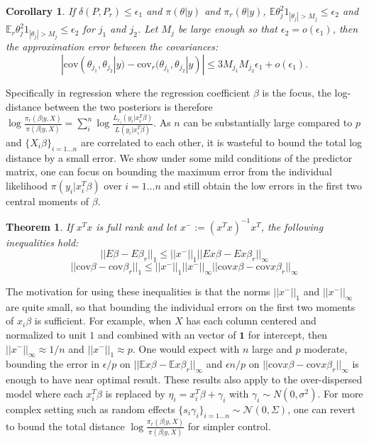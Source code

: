 \documentclass[10pt]{article}
\newcommand{\xbeta}{ x_i^T \beta}
\newtheorem{theorem}{Theorem}
\newtheorem{corollary}{Corollary}
\begin{document}
\begin{corollary}
If $\delta( P,P_r)\le \epsilon_1$ and $\pi(\theta|y)$ and $\pi_r(\theta|y)$, $\mathbb{E} \theta_j^2 {1}_{|\theta_j|>M_j}\le \epsilon_2$ and $\mathbb{E}_{r} \theta_j^2 {1}_{|\theta_j|>M_j}\le \epsilon_2$ for $j_1$ and $j_2$.  Let $M_j$ be large enough so that $\epsilon_2=o(\epsilon_1)$, then the approximation error between the covariances:
$$|\mbox{cov}(\theta_{j_1},\theta_{j_2}|y)-\mbox{cov}_r(\theta_{j_1},\theta_{j_2}|y)|\le 3M_{j_1}M_{j_2}\epsilon_1+o(\epsilon_1 ).$$
\end{corollary}

Specifically in regression where the regression coefficient $\beta$ is the focus, the log-distance between the two posteriors is therefore $\log \frac{\pi_{r}( \beta | y,X)}{\pi( \beta | y,X)}=\sum_i^{n}\log \frac{L_{r_i}( y_i| \xbeta)}{L( y_i| \xbeta)}$. As $n$ can be substantially large compared to $p$ and $\{X_i\beta\}_{i=1\ldots n}$ are correlated to each other, it is wasteful to bound the total log distance by a small error. We show under some  mild conditions of the predictor matrix, one can focus on bounding the maximum error from the individual likelihood $\pi(y_i|x_i^T\beta)$ over $i=1\ldots n$ and still obtain the low errors in the first two central moments of $\beta$.

\begin{theorem}
If $x^Tx$ is full rank and let $x^{-}:=(x^Tx)^{-1}x^T$, the following inequalities hold:\\
$$||{E}\beta-{E}\beta_r||_1 \le ||x^{-}||_1 ||{E}x\beta- {E}x\beta_r||_\infty$$
$$||\mbox{cov}\beta-\mbox{cov}\beta_r||_1 \le ||x^{-}||_1 ||x^{-}||_\infty ||\mbox{cov} x\beta- \mbox{cov}x\beta_r||_\infty$$
\end{theorem}

The motivation for using these inequalities is that the norms $||x^{-}||_1$ and $||x^{-}||_\infty$ are quite small, so that bounding the individual errors on the first two moments of $x_i\beta$ is sufficient. For example, when $X$ has each column centered and normalized to unit $1$ and combined with an vector of $\boldsymbol 1$ for intercept, then $||x^{-}||_\infty\approx 1/n$ and $||x^{-}||_1\approx p$. One would expect with $n$ large and $p$ moderate, bounding the error in $\epsilon/p$ on $||\mathbb{E}x\beta- \mathbb{E}x\beta_r||_\infty$ and $\epsilon n/p$ on $||\mbox{cov} x\beta- \mbox{cov}x\beta_r||_\infty$ is enough to have near optimal result. These results also apply to the over-dispersed model where each $\xbeta$ is replaced by $\eta_i=  \xbeta + \gamma_i$ with $\gamma_i\sim N(0,\sigma^2)$. For more complex setting such as random effects $\{ s_i\gamma_i\}_{i=1\ldots n} \sim \mathcal{N}(0,\Sigma)$, one can revert to bound the total distance $\log \frac{\pi_{r}( \beta | y,X)}{\pi( \beta | y,X)}$ for simpler control.
\end{document}
